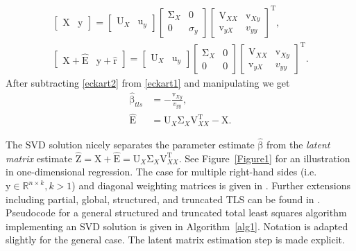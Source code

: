 \documentclass[10pt,a4paper]{article}
\theoremstyle{plain}
\theoremstyle{definition}
\newcommand{\boldvec}[1]{\boldsymbol{\mathrm{#1}}}
\let\vec\boldvec
\newcommand{\designMat}{\vec{X}} %
\newcommand{\latentMat}{\vec{Z}} %
\newcommand{\observations}{\vec{y}} %
\newcommand{\param}{\vec{\beta}} %
\newcommand{\residual}{\vec{r}} %
\newcommand{\errorMat}{\vec{E}} %
\newcommand{\leftEigenvector}{\vec{U}} %
\newcommand{\rightEigenvector}{\vec{V}} %
\begin{document}
\begin{align}
\begin{bmatrix} \designMat & \observations \end{bmatrix} = \begin{bmatrix} \leftEigenvector_{X} & \vec{u}_{y} \end{bmatrix} \begin{bmatrix} \vec{\Sigma}_{X} & 0 \\ 0 & \sigma_{y} \end{bmatrix} \begin{bmatrix} \rightEigenvector_{XX} & \vec{v}_{Xy} \\ \vec{v}_{yX} & v_{yy} \end{bmatrix}^{\mathrm{T}}, \label{eckart1} \\
\begin{bmatrix} \designMat + \hat{\errorMat} & \observations + \hat{\residual} \end{bmatrix} = \begin{bmatrix} \leftEigenvector_{X} & \vec{u}_{y} \end{bmatrix} \begin{bmatrix} \vec{\Sigma}_{X} & 0 \\ 0 & 0 \end{bmatrix} \begin{bmatrix} \rightEigenvector_{XX} & \vec{v}_{Xy} \\ \vec{v}_{yX} & v_{yy} \end{bmatrix}^{\mathrm{T}} \label{eckart2}.
\end{align}
% 
\noindent After subtracting \eqref{eckart2} from \eqref{eckart1} and manipulating we get
%
\begin{align}
\hat{\param}_{tls} &= -\frac{\vec{v}_{Xy}}{v_{yy}}, \label{tls1} \\
\hat{\errorMat} &= \leftEigenvector_{X} \vec{\Sigma}_{X} \rightEigenvector_{XX}^{\mathrm{T}} - \designMat. \label{tls2}
\end{align}

\noindent The SVD solution nicely separates the parameter estimate $\hat{\param}$ from the \emph{latent matrix} estimate $\hat{\latentMat} = \designMat + \hat{\errorMat} = \leftEigenvector_{X} \vec{\Sigma}_{X} \rightEigenvector_{XX}^{\mathrm{T}}$. See Figure~\ref{Figure1} for an illustration in one-dimensional regression. The case for multiple right-hand sides (i.e. $\observations \in \mathbb{R}^{n \times k}, k > 1$) and diagonal weighting matrices is given in \cite{Golub96}. Further extensions including partial, global, structured, and truncated TLS can be found in \cite{VanHuffel91}. 
Pseudocode for a general structured and truncated total least squares algorithm implementing an SVD solution is given in Algorithm~\ref{alg1}. Notation is adapted slightly for the general case. The latent matrix estimation step is made explicit. %
\end{document}
